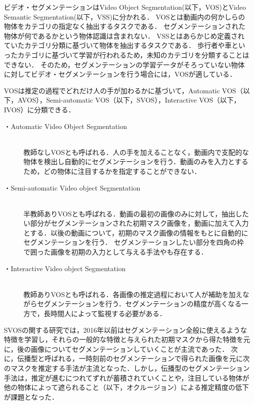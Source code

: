 ビデオ・セグメンテーションはVideo Object Segmentation(以下，VOS)とVideo Semantic Segmentation(以下，VSS)に分かれる．
VOSとは動画内の何かしらの物体をカテゴリの指定なく抽出するタスクである．
セグメンテーションされた物体が何であるかという物体認識は含まれない．
VSSとはあらかじめ定義されていたカテゴリ分類に基づいて物体を抽出するタスクである．
歩行者や車といったカテゴリに基づいて学習が行われるため，未知のカテゴリを分類することはできない．
そのため，セグメンテーションの学習データがそろっていない物体に対してビデオ・セグメンテーションを行う場合には，VOSが適している．

VOSは推定の過程でどれだけ人の手が加わるかに基づいて，Automatic VOS（以下，AVOS），Semi-automatic VOS（以下，SVOS），Interactive VOS（以下，IVOS）に分類できる\cite{garcia2018survey}．
\begin{description}
   \item[・Automatic Video Object Segmentation]\mbox{}\\
   教師なしVOSとも呼ばれる．人の手を加えることなく，動画内で支配的な物体を検出し自動的にセグメンテーションを行う．動画のみを入力とするため，どの物体に注目するかを指定することができない．
   \item[・Semi-automatic Video object Segmentation]\mbox{}\\
   半教師ありVOSとも呼ばれる．動画の最初の画像のみに対して，抽出したい部分がセグメンテーションされた初期マスク画像を，動画に加えて入力とする．以後の動画について，初期のマスク画像の情報をもとに自動的にセグメンテーションを行う．
   セグメンテーションしたい部分を四角の枠で囲った画像を初期の入力として与える手法やも存在する．
   \label{SVOS}
   \item[・Interactive Video object Segmentation]\mbox{}\\
   教師ありVOSとも呼ばれる．各画像の推定過程において人が補助を加えながらセグメンテーションを行う．セグメンテーションの精度が高くなる一方で，長時間人によって監視する必要がある．
\end{description}

SVOSの関する研究では，2016年以前はセグメンテーション全般に使えるような特徴を学習し，それらの一般的な特徴と与えられた初期マスクから得た特徴を元に，後の画像についてセグメンテーションしていくことが主流であった．
次に，伝播型と呼ばれる，一時刻前のセグメンテーションで得られた画像を元に次のマスクを推定する手法が主流となった．しかし，伝播型のセグメンテーション手法は，推定が進むにつれてずれが蓄積されていくことや，注目している物体が他の物体によって遮られること（以下，オクルージョン）による推定精度の低下が課題となった\cite{garcia2018survey}．

